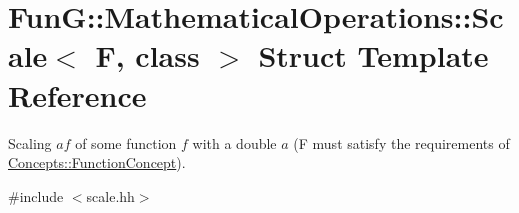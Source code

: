 \hypertarget{structFunG_1_1MathematicalOperations_1_1Scale}{\section{\-Fun\-G\-:\-:\-Mathematical\-Operations\-:\-:\-Scale$<$ \-F, class $>$ \-Struct \-Template \-Reference}
\label{structFunG_1_1MathematicalOperations_1_1Scale}
}


\-Scaling $ af $ of some function $ f $ with a double $ a $ (\-F must satisfy the requirements of \hyperlink{structFunG_1_1Concepts_1_1FunctionConcept}{\-Concepts\-::\-Function\-Concept}).  




{\ttfamily \#include $<$scale.\-hh$>$}

